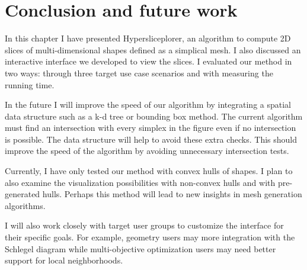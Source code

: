 \section{Conclusion and future work}
\label{sec:conclusion}

In this chapter I have presented Hypersliceplorer, an algorithm to compute
2D slices of multi-dimensional shapes defined as a simplical mesh. 
I also discussed an interactive interface we developed to view the slices.
I evaluated our method in two ways: through three target use case scenarios
and with measuring the running time.

In the future I will improve the speed of our algorithm by integrating a
spatial data structure such as a k-d tree or bounding box method. The current
algorithm must find an intersection with every simplex in the figure even if
no intersection is possible.
The data structure will help to avoid these extra checks. This should
improve the speed of the algorithm by avoiding unnecessary intersection tests.

Currently, I have only tested our method with convex hulls of shapes. I
plan to also examine the visualization possibilities with non-convex hulls
and with pre-generated hulls. Perhaps this method will lead to new insights
in mesh generation algorithms.

I will also work closely with target user groups to customize the interface
for their specific goals. For example, geometry users may more integration with
the Schlegel diagram while multi-objective optimization users may need better
support for local neighborhoods.


